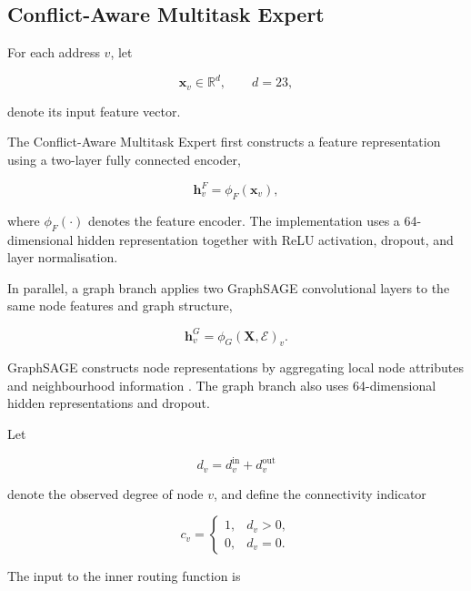 \documentclass{ieeeaccess}
\begin{document}
\subsection{Conflict-Aware Multitask Expert}

For each address \(v\), let

\begin{equation}
\mathbf{x}_v \in \mathbb{R}^{d},
\qquad d=23,
\end{equation}

denote its input feature vector.

The Conflict-Aware Multitask Expert first constructs a feature representation using a two-layer fully connected encoder,

\begin{equation}
\mathbf{h}^{F}_v
=
\phi_F(\mathbf{x}_v),
\end{equation}

where \(\phi_F(\cdot)\) denotes the feature encoder. The implementation uses a 64-dimensional hidden representation together with ReLU activation, dropout, and layer normalisation.

In parallel, a graph branch applies two GraphSAGE convolutional layers to the same node features and graph structure,

\begin{equation}
\mathbf{h}^{G}_v
=
\phi_G(\mathbf{X},\mathcal{E})_v.
\end{equation}

GraphSAGE constructs node representations by aggregating local node attributes and neighbourhood information \cite{hamilton2017graphsage}. The graph branch also uses 64-dimensional hidden representations and dropout.

Let

\begin{equation}
d_v
=
d_v^{\mathrm{in}}
+
d_v^{\mathrm{out}}
\end{equation}

denote the observed degree of node \(v\), and define the connectivity indicator

\begin{equation}
c_v
=
\begin{cases}
1, & d_v>0,\\
0, & d_v=0.
\end{cases}
\label{eq:connectivity_indicator}
\end{equation}

The input to the inner routing function is
\end{document}
